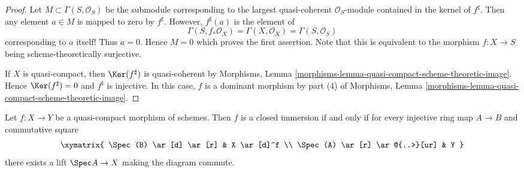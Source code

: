 \begin{proof}
Let $M \subset \Gamma(S, \mathcal{O}_S)$ be the submodule corresponding
to the largest quasi-coherent $\mathcal{O}_S$-module contained 
in the kernel of $f^\sharp$. Then any element $a \in M$ is mapped
to zero by $f^\sharp$. However, $f^\sharp(a)$ is the element of
$$
\Gamma(S, f_*\mathcal{O}_X) = \Gamma(X, \mathcal{O}_X) =
\Gamma(S, \mathcal{O}_S)
$$
corresponding to $a$ itself! Thus $a = 0$. Hence $M = 0$ which proves
the first assertion. Note that this is equivalent to the morphism 
$f : X \to S$ being scheme-theoretically surjective.

\medskip\noindent
If $X$ is quasi-compact, then $\Ker(f^\sharp)$ is quasi-coherent by
Morphisms, Lemma \ref{morphisms-lemma-quasi-compact-scheme-theoretic-image}.
Hence $\Ker(f^\sharp) = 0$ and $f^\sharp$ is injective.
In this case, $f$ is a dominant morphism by part (4) of
Morphisms, Lemma \ref{morphisms-lemma-quasi-compact-scheme-theoretic-image}.
\end{proof}

\begin{lemma}
\label{lemma-extensive-criterion}
Let $f: X \to Y$ be a quasi-compact morphism of schemes.
Then $f$ is a closed immersion if and only if for every injective 
ring map $A \to B$ and commutative square
$$
\xymatrix{
\Spec(B) \ar[d] \ar[r] & X \ar[d]^f \\
\Spec(A) \ar[r] \ar@{..>}[ur] & Y
}
$$
there exists a lift $\Spec A \to X$ making the diagram commute.
\end{lemma}


